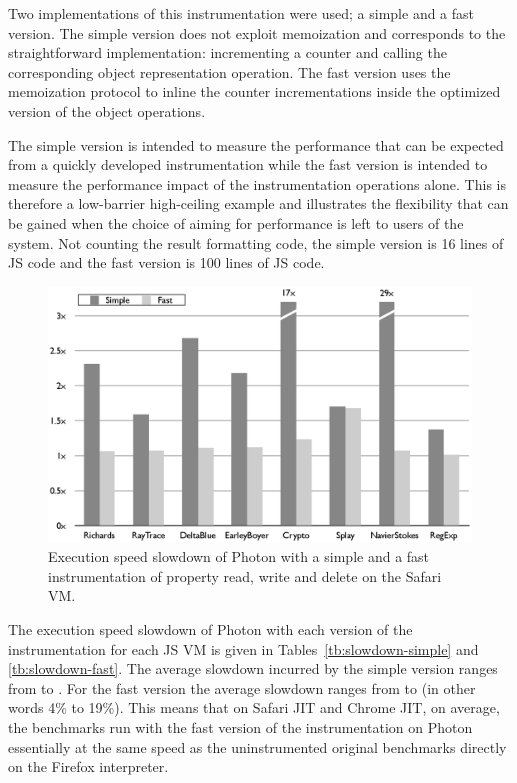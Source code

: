 Two implementations of this instrumentation were used; a simple and a
fast version.  The simple version does not exploit memoization and
corresponds to the straightforward implementation: incrementing a
counter and calling the corresponding object representation
operation. The fast version uses the memoization protocol to inline
the counter incrementations inside the optimized version of the object
operations.

The simple version is intended to measure the performance that can be
expected from a quickly developed instrumentation while the fast
version is intended to measure the performance impact of the
instrumentation operations alone. This is therefore a low-barrier
high-ceiling example and illustrates the flexibility that can be
gained when the choice of aiming for performance is left to users of
the system.  Not counting the result formatting code, the simple
version is 16 lines of JS code and the fast version is 100 lines of
JS code.

\begin{figure}[htbp]
\begin{center}
\includegraphics[width=.85\textwidth]{figures/InstrumentationSlowdown}
\caption[Execution speed slowdown of Photon with an instrumentation]{Execution
speed slowdown of Photon with a simple and a fast instrumentation of property
read, write and delete on the Safari VM.}
\label{fig:instr-slowdown}
\end{center}
\end{figure}

The execution speed slowdown of Photon with each version of the
instrumentation for each JS VM is given in
Tables~\ref{tb:slowdown-simple} and \ref{tb:slowdown-fast}.  The
average slowdown incurred by the simple version ranges from  to
.  For the fast version the average slowdown ranges from  to
 (in other words 4\% to 19\%).  This means that on Safari JIT
and Chrome JIT, on average, the benchmarks run with the fast version
of the instrumentation on Photon essentially at the same speed as the
uninstrumented original benchmarks directly on the Firefox
interpreter.

